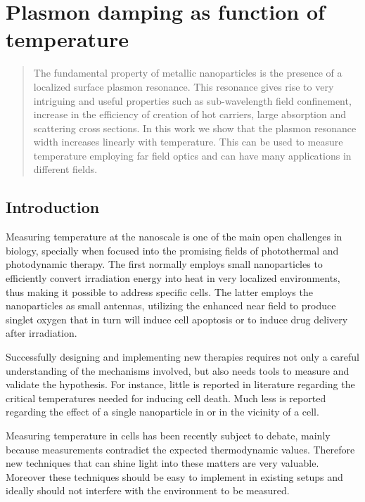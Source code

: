 \chapter{Plasmon damping as function of temperature}
\label{ch:Damping}

\begin{abstract}
The fundamental property of metallic nanoparticles is the presence of a
localized surface plasmon resonance. This resonance gives rise to very
intriguing and useful properties such as sub-wavelength field confinement,
increase in the efficiency of creation of hot carriers, large absorption and
scattering cross sections. In this work we show that the plasmon resonance width
increases linearly with temperature. This can be used to measure temperature
employing far field optics and can have many applications in different fields.
\end{abstract}


\section{Introduction}
Measuring temperature at the nanoscale is one of the main open challenges in
biology\cite{Yang2011a}, specially when focused into the promising fields of
photothermal\cite{Huang2006a,Hirsch2003} and photodynamic
therapy\cite{West2003}. The first normally employs small nanoparticles to
efficiently convert irradiation energy into heat in very localized
environments\cite{Ma2014a}, thus making it possible to address specific
cells\cite{Hirsch2003,Huang2008}. The latter employs the nanoparticles as small
antennas, utilizing the enhanced near field to produce singlet oxygen that in
turn will induce cell apoptosis\cite{Hone2002} or to induce drug
delivery after irradiation\cite{Cheng2008}.

Successfully designing and implementing new therapies requires not only a
careful understanding of the mechanisms involved, but also needs tools to
measure and validate the hypothesis. For instance, little is reported in
literature regarding the critical temperatures needed for inducing cell
death\cite{Huang2006a}. Much less is reported regarding the effect of a single
nanoparticle in or in the vicinity of a cell.

Measuring temperature in cells has been recently subject to debate, mainly
because measurements contradict the expected thermodynamic
values\cite{Tanimoto2016,Donner2013,Yang2011a}. Therefore new
techniques that can shine light into these matters are very valuable. Moreover
these techniques should be easy to implement in existing setups and ideally
should not interfere with the environment to be measured.

